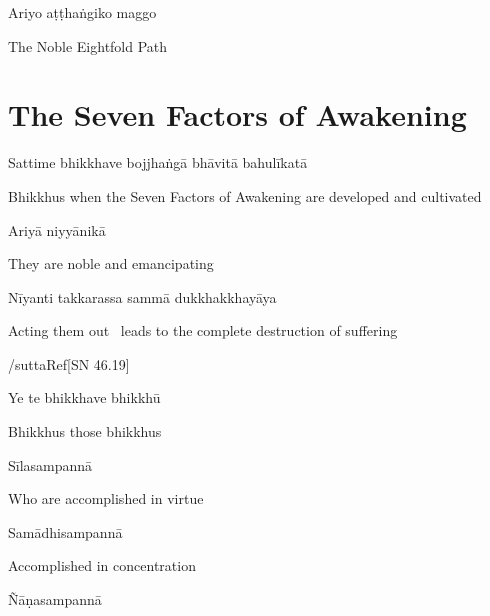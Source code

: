Ariyo aṭṭhaṅgiko maggo

\begin{cprenglish}
  The Noble Eightfold Path
\end{cprenglish}

\suttaRef{[DN 16]}

\clearpage

\section{The Seven Factors of Awakening}
\label{seven-awakening-factors}

\begin{leader}
\end{leader}

Sattime bhikkhave bojjhaṅgā bhāvitā bahulīkatā

\begin{cprenglish}
  Bhikkhus when the Seven Factors of Awakening are developed and cultivated
\end{cprenglish}

Ariyā niyyānikā

\begin{cprenglish}
  They are noble and emancipating
\end{cprenglish}

Nīyanti takkarassa sammā dukkhakkhayāya

\begin{cprenglish}
  Acting them out \breathmark\ leads to the complete destruction of suffering
\end{cprenglish}

/suttaRef{[SN 46.19]}

Ye te bhikkhave bhikkhū

\begin{cprenglish}
  Bhikkhus those bhikkhus
\end{cprenglish}

Sīlasampannā

\begin{cprenglish}
  Who are accomplished in virtue
\end{cprenglish}

Samādhisampannā

\begin{cprenglish}
  Accomplished in concentration
\end{cprenglish}

Ñāṇasampannā

